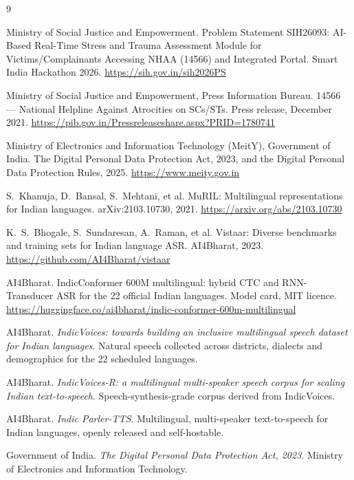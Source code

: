 \documentclass[11pt,a4paper]{article}
\begin{document}
\begin{thebibliography}{9}
\setlength{\itemsep}{3pt}
\small

Ministry of Social Justice and Empowerment.
Problem Statement SIH26093: AI-Based Real-Time Stress and Trauma Assessment Module for
Victims/Complainants Accessing NHAA (14566) and Integrated Portal. Smart India Hackathon 2026.
\url{https://sih.gov.in/sih2026PS}

Ministry of Social Justice and Empowerment, Press Information Bureau.
14566 --- National Helpline Against Atrocities on SCs/STs. Press release, December 2021.
\url{https://pib.gov.in/Pressreleaseshare.aspx?PRID=1780741}

Ministry of Electronics and Information Technology (MeitY), Government of India.
The Digital Personal Data Protection Act, 2023, and the Digital Personal Data Protection Rules, 2025.
\url{https://www.meity.gov.in}

S.~Khanuja, D.~Bansal, S.~Mehtani, et al.
MuRIL: Multilingual representations for Indian languages. arXiv:2103.10730, 2021.
\url{https://arxiv.org/abs/2103.10730}

K.~S.~Bhogale, S.~Sundaresan, A.~Raman, et al.
Vistaar: Diverse benchmarks and training sets for Indian language ASR. AI4Bharat, 2023.
\url{https://github.com/AI4Bharat/vistaar}

AI4Bharat.
IndicConformer 600M multilingual: hybrid CTC and RNN-Transducer ASR for the 22 official Indian
languages. Model card, MIT licence.
\url{https://huggingface.co/ai4bharat/indic-conformer-600m-multilingual}

AI4Bharat. \emph{IndicVoices: towards building an inclusive multilingual speech dataset for Indian
languages}. Natural speech collected across districts, dialects and demographics for the 22 scheduled
languages.

AI4Bharat. \emph{IndicVoices-R: a multilingual multi-speaker speech corpus for scaling Indian
text-to-speech}. Speech-synthesis-grade corpus derived from IndicVoices.

AI4Bharat. \emph{Indic Parler-TTS}. Multilingual, multi-speaker text-to-speech for Indian languages,
openly released and self-hostable.

Government of India. \emph{The Digital Personal Data Protection Act, 2023}. Ministry of Electronics
and Information Technology.


\end{thebibliography}
\end{document}
